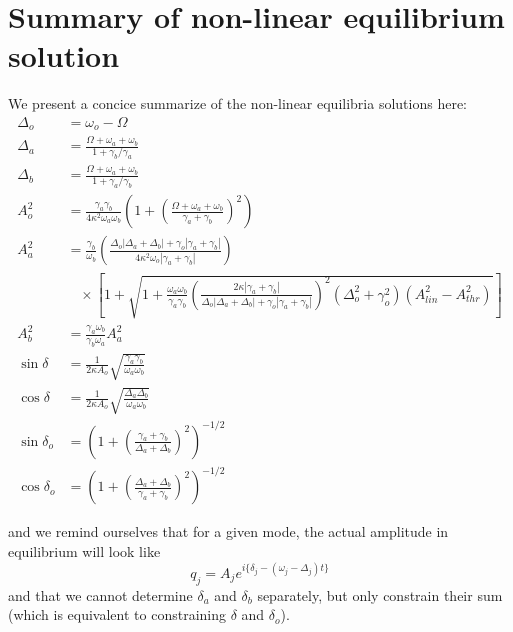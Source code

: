 \section*{Summary of non-linear equilibrium solution}

We present a concice summarize of the non-linear equilibria solutions here:
\begin{subequations}
\begin{align}
\Delta_o & = \omega_o - \Omega \\
\Delta_a & = \frac{\Omega + \omega_a + \omega_b}{1 + \gamma_b/\gamma_a} \\
\Delta_b & = \frac{\Omega + \omega_a + \omega_b}{1 + \gamma_a/\gamma_b} \\
A_o^2 & = \frac{\gamma_a\gamma_b}{4\kappa^2\omega_a\omega_b}\left(1 + \left(\frac{\Omega + \omega_a + \omega_b}{\gamma_a + \gamma_b}\right)^2 \right) \\
A_a^2 & = \frac{\gamma_b}{\omega_b}\left(\frac{\Delta_o|\Delta_a+\Delta_b|+\gamma_o|\gamma_a+\gamma_b|}{4\kappa^2\omega_o|\gamma_a+\gamma_b|}\right) \\
    & \ \ \ \ \times \left[ 1 + \sqrt{ 1 + \frac{\omega_a\omega_b}{\gamma_a\gamma_b}\left( \frac{2\kappa|\gamma_a+\gamma_b|}{\Delta_o|\Delta_a+\Delta_b|+\gamma_o|\gamma_a+\gamma_b|}\right)^2 (\Delta_o^2 + \gamma_o^2) (A_{lin}^2 - A_{thr}^2) } \right ] \\
A_b^2 & = \frac{\gamma_a\omega_b}{\gamma_b\omega_a}A_a^2 \\
\sin\delta & = \frac{1}{2\kappa A_o}\sqrt{ \frac{\gamma_a\gamma_b}{\omega_a\omega_b} } \\
\cos\delta & = \frac{1}{2\kappa A_o}\sqrt{ \frac{\Delta_a\Delta_b}{\omega_a\omega_b} } \\
\sin\delta_o & = \left( 1 + \left( \frac{\gamma_a+\gamma_b}{\Delta_a+\Delta_b}\right)^2 \right)^{-1/2} \\
\cos\delta_o & = \left( 1 + \left( \frac{\Delta_a+\Delta_b}{\gamma_a+\gamma_b}\right)^2 \right)^{-1/2}
\end{align}
\end{subequations}

and we remind ourselves that for a given mode, the actual amplitude in equilibrium will look like
\begin{equation}
q_j = A_j e^{i\{\delta_j - (\omega_j - \Delta_j)t \}}
\end{equation}
and that we cannot determine $\delta_a$ and $\delta_b$ separately, but only constrain their sum (which is equivalent to constraining $\delta$ and $\delta_o$).
